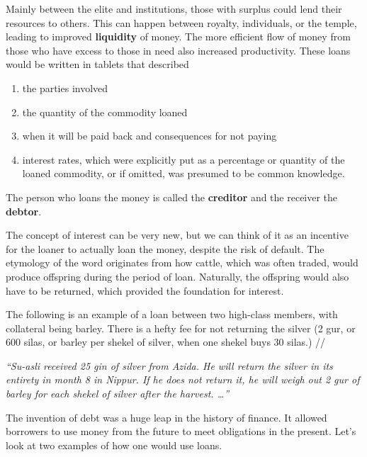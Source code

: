 \documentclass{article}
\begin{document}
    \begin{finance}
      Mainly between the elite and institutions, those with surplus could lend their resources to others. This can happen between royalty, individuals, or the temple, leading to improved \textbf{liquidity} of money. The more efficient flow of money from those who have excess to those in need also increased productivity. These loans would be written in tablets that described 
      \begin{enumerate}
        \item the parties involved 
        \item the quantity of the commodity loaned 
        \item when it will be paid back and consequences for not paying
        \item interest rates, which were explicitly put as a percentage or quantity of the loaned commodity, or if omitted, was presumed to be common knowledge.
      \end{enumerate}
      The person who loans the money is called the \textbf{creditor} and the receiver the \textbf{debtor}.
    \end{finance}

    The concept of interest can be very new, but we can think of it as an incentive for the loaner to actually loan the money, despite the risk of default. The etymology of the word originates from how cattle, which was often traded, would produce offspring during the period of loan. Naturally, the offspring would also have to be returned, which provided the foundation for interest. 

    \begin{example}
      The following is an example of a loan between two high-class members, with collateral being barley. There is a hefty fee for not returning the silver (2 gur, or 600 silas, or barley per shekel of silver, when one shekel buys 30 silas.)
      //

      \begin{center}
        \textit{“Su-asli received 25 gin of silver from Azida. He will return the silver in its entirety in month 8 in Nippur. If he does not return it, he will weigh out 2 gur of barley for each shekel of silver after the harvest. …”}
      \end{center}
    \end{example}

    The invention of debt was a huge leap in the history of finance. It allowed borrowers to use money from the future to meet obligations in the present. Let's look at two examples of how one would use loans. 
\end{document}
